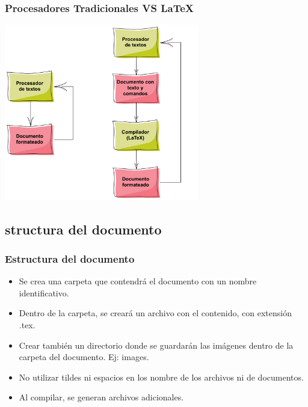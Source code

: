 \documentclass[aspectratio=43]{beamer}%
\begin{document}
\begin{frame}[fragile]
\frametitle{\textbf{Procesadores Tradicionales VS \LaTeX{}}}
\justifying
\begin{center}
 \includegraphics[width=8.5cm]{images/vs}
\end{center}

\end{frame}
\subsection{structura del documento}
\begin{frame}[fragile]
\frametitle{\textbf{Estructura del documento}}
\justifying
 \begin{itemize}\justifying
  \item Se crea una carpeta que contendrá el documento con un nombre identificativo.
  \item Dentro de la carpeta, se creará un archivo con el contenido, con extensión .tex.
  \item Crear también un directorio donde se guardarán las imágenes dentro de la carpeta del documento. Ej: images.
  \item No utilizar tildes ni espacios en los nombre de los archivos ni de documentos.
  \item Al compilar, se generan archivos adicionales.
\end{itemize}

\end{frame}
\end{document}
